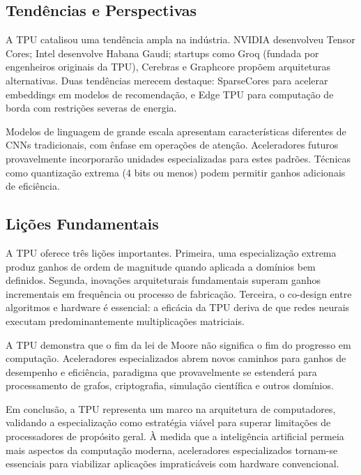 \documentclass[12pt,a4paper]{article}
\begin{document}
\subsection{Tendências e Perspectivas}

A TPU catalisou uma tendência ampla na indústria. NVIDIA desenvolveu Tensor Cores; Intel desenvolve Habana Gaudi; startups como Groq (fundada por engenheiros originais da TPU), Cerebras e Graphcore propõem arquiteturas alternativas. Duas tendências merecem destaque: SparseCores para acelerar embeddings em modelos de recomendação, e Edge TPU para computação de borda com restrições severas de energia.

Modelos de linguagem de grande escala apresentam características diferentes de CNNs tradicionais, com ênfase em operações de atenção. Aceleradores futuros provavelmente incorporarão unidades especializadas para estes padrões. Técnicas como quantização extrema (4 bits ou menos) podem permitir ganhos adicionais de eficiência.

\subsection{Lições Fundamentais}

A TPU oferece três lições importantes. Primeira, uma especialização extrema produz ganhos de ordem de magnitude quando aplicada a domínios bem definidos. Segunda, inovações arquiteturais fundamentais superam ganhos incrementais em frequência ou processo de fabricação. Terceira, o co-design entre algoritmos e hardware é essencial: a eficácia da TPU deriva de que redes neurais executam predominantemente multiplicações matriciais.

A TPU demonstra que o fim da lei de Moore não significa o fim do progresso em computação. Aceleradores especializados abrem novos caminhos para ganhos de desempenho e eficiência, paradigma que provavelmente se estenderá para processamento de grafos, criptografia, simulação científica e outros domínios.

Em conclusão, a TPU representa um marco na arquitetura de computadores, validando a especialização como estratégia viável para superar limitações de processadores de propósito geral. À medida que a inteligência artificial permeia mais aspectos da computação moderna, aceleradores especializados tornam-se essenciais para viabilizar aplicações impraticáveis com hardware convencional.

\newpage
\end{document}
